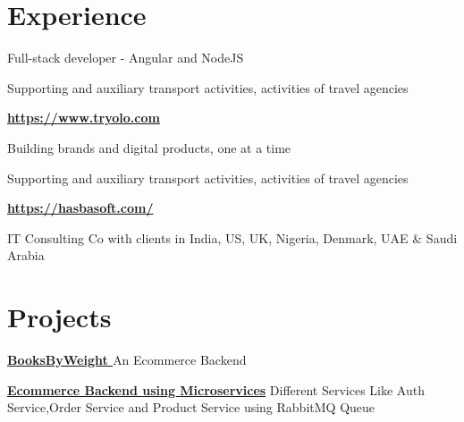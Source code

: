 \documentclass[]{deedy-resume-openfont}
\begin{document}
\hfill
\begin{minipage}[t]{0.66\textwidth} 


\section{Experience}
\sectionsep
{}
\sectionsep
\vspace{\topsep} %
\begin{tightemize}
\item Full-stack developer - Angular and NodeJS
\item Supporting and auxiliary transport activities, activities of travel agencies
\end{tightemize}
\sectionsep
\sectionsep

\href{https://www.tryolo.com/}{\bf https://www.tryolo.com} 
\sectionsep
\item 
Building brands and digital products, one at a time
\sectionsep

\sectionsep
\item Supporting and auxiliary transport activities, activities of travel agencies
\sectionsep

\sectionsep
{}
\href{https://hasbasoft.com/}{\bf https://hasbasoft.com/} 
\sectionsep
\item IT Consulting Co with clients in India, US, UK, Nigeria, Denmark, UAE & Saudi Arabia
\sectionsep

\sectionsep

\section{Projects}
\sectionsep
\runsubsection \textbf{\href{https://github.com/aawezk786/bbw-backend/}{BooksByWeight }}
\sectionsep
An Ecommerce Backend
\sectionsep

\runsubsection \textbf{\href{https://github.com/aawezk786/ecom-microservices/}{Ecommerce Backend using Microservices}}
\sectionsep
Different Services Like Auth Service,Order Service and Product Service using RabbitMQ Queue
\sectionsep


\end{minipage}
\end{document}
